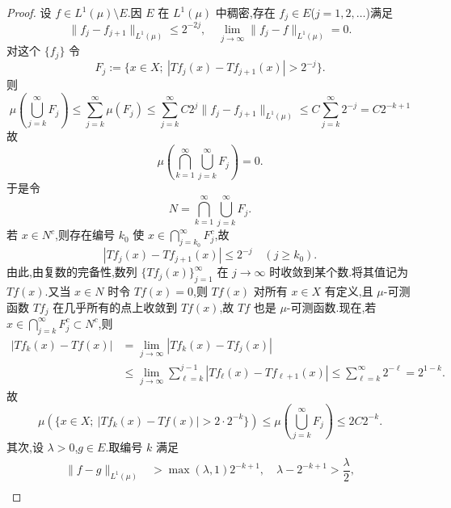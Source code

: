 \begin{proof}
设 $f \in L^{1}(\mu) \setminus E$.因 $E$ 在 $L^{1}(\mu)$ 中稠密,存在 $f_{j} \in E$($j = 1, 2, \ldots$)满足
\begin{equation*}
\| f_{j} - f_{j+1} \|_{L^{1}(\mu)} \leq 2^{-2j}, \quad \lim_{j \to \infty}\| f_{j} - f \|_{L^{1}(\mu)} = 0.
\end{equation*}
对这个 $\{f_{j}\}$ 令
\begin{equation*}
F_{j} := \{x \in X;\ |Tf_{j}(x) - Tf_{j+1}(x)| > 2^{-j}\}.
\end{equation*}
则
\begin{equation*}
\mu\left(\bigcup_{j = k}^{\infty} F_{j}\right) \leq \sum_{j = k}^{\infty}\mu(F_{j}) \leq \sum_{j = k}^{\infty} C2^{j}\| f_{j} - f_{j+1} \|_{L^{1}(\mu)} \leq C\sum_{j = k}^{\infty}2^{-j} = C2^{-k+1}
\end{equation*}
故
\begin{equation*}
\mu\left(\bigcap_{k = 1}^{\infty}\bigcup_{j = k}^{\infty} F_{j}\right) = 0.
\end{equation*}
于是令
\begin{equation*}
N = \bigcap_{k = 1}^{\infty}\bigcup_{j = k}^{\infty} F_{j}.
\end{equation*}
若 $x \in N^{c}$,则存在编号 $k_{0}$ 使 $x \in \bigcap_{j = k_{0}}^{\infty}F_{j}^{c}$,故
\begin{equation*}
|Tf_{j}(x) - Tf_{j+1}(x)| \leq 2^{-j} \quad (j \geq k_{0}).
\end{equation*}
由此,由复数的完备性,数列 $\{Tf_{j}(x)\}_{j=1}^{\infty}$ 在 $j \to \infty$ 时收敛到某个数.将其值记为 $Tf(x)$.又当 $x \in N$ 时令 $Tf(x) = 0$,则 $Tf(x)$ 对所有 $x \in X$ 有定义,且 $\mu$-可测函数 $Tf_{j}$ 在几乎所有的点上收敛到 $Tf(x)$,故 $Tf$ 也是 $\mu$-可测函数.现在,若 $x \in \bigcap_{j = k}^{\infty}F_{j}^{c} \subset N^{c}$,则
\begin{align*}
|Tf_{k}(x) - Tf(x)| & = \displaystyle\lim_{j \to \infty}|Tf_{k}(x) - Tf_{j}(x)| \\
& \leq \displaystyle\lim_{j \to \infty}\sum_{\ell = k}^{j-1}|Tf_{\ell}(x) - Tf_{\ell+1}(x)| \leq \sum_{\ell = k}^{\infty}2^{-\ell} = 2^{1-k}.
\end{align*}
故
\begin{equation*}
\mu(\{x \in X;\ |Tf_{k}(x) - Tf(x)| > 2 \cdot 2^{-k}\}) \leq \mu\left(\bigcup_{j = k}^{\infty} F_{j}\right) \leq 2C2^{-k}.
\end{equation*}
其次,设 $\lambda > 0$,$g \in E$.取编号 $k$ 满足
\begin{align*}
\| f - g \|_{L^{1}(\mu)} &> \max(\lambda, 1)2^{-k+1}, \quad \lambda - 2^{-k+1} > \dfrac{\lambda}{2}, \\

\end{align*}
\end{proof}
